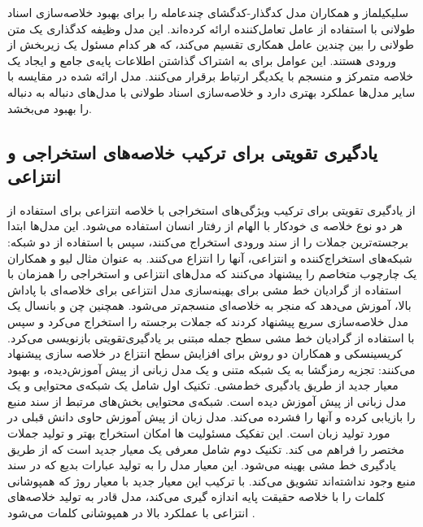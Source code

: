 سلیکیلماز
و همکاران مدل کدگذار-کدگشای چندعامله را برای بهبود خلاصه‌سازی اسناد طولانی با استفاده از عامل تعامل‌کننده
ارائه کرده‌اند. این مدل وظیفه کدگذاری یک متن طولانی را بین چندین عامل همکاری تقسیم می‌کند، که هر کدام مسئول یک زیربخش از ورودی هستند. این عوامل برای به اشتراک گذاشتن اطلاعات پایه‌ی جامع و ایجاد یک خلاصه متمرکز و منسجم با یکدیگر ارتباط برقرار می‌کنند. مدل ارائه شده در مقایسه با سایر مدل‌ها عملکرد بهتری دارد و خلاصه‌سازی اسناد طولانی با مدل‌های دنباله به دنباله را بهبود می‌بخشد.
\subsection{یادگیری تقویتی برای ترکیب خلاصه‌های استخراجی و انتزاعی} 
از یادگیری تقویتی برای ترکیب ویژگی‌های استخراجی با خلاصه انتزاعی برای استفاده از هر دو نوع خلاصه ی خودکار با الهام از رفتار انسان استفاده می‌شود. این مدل‌ها ابتدا برجسته‌ترین جملات را از سند ورودی استخراج می‌کنند، سپس با استفاده از دو شبکه: شبکه‌های استخراج‌کننده و انتزاعی، آنها را انتزاع می‌کنند. به عنوان مثال لیو
و همکاران یک چارچوب متخاصم را پیشنهاد می‌کنند که مدل‌های انتزاعی و استخراجی را همزمان با استفاده از گرادیان خط ‌مشی برای بهینه‌سازی مدل انتزاعی برای خلاصه‌ای با پاداش بالا، آموزش می‌دهد که منجر به خلاصه‌ای منسجم‌تر می‌شود\cite{liu2018generative}.
همچنین چن و بانسال
یک مدل خلاصه‌سازی سریع پیشنهاد کردند که جملات برجسته را استخراج می‌کرد و سپس با استفاده از گرادیان خط مشی سطح جمله مبتنی بر یادگیری‌تقویتی بازنویسی می‌کرد\cite{chen2018fast}.
کریسینسکی 
و همکاران دو روش برای افزایش سطح انتزاع در خلاصه سازی پیشنهاد می‌کنند: تجزیه رمزگشا به یک شبکه متنی و یک مدل زبانی از پیش آموزش‌دیده، و بهبود معیار جدید از طریق یادگیری خط‌مشی.
تکنیک اول شامل یک شبکه‌ی محتوایی
و یک مدل زبانی از پیش آموزش دیده است. شبکه‌ی محتوایی بخش‌های مرتبط از سند منبع را بازیابی کرده و آنها را فشرده می‌کند. مدل زبان از پیش آموزش حاوی دانش قبلی در مورد تولید زبان است. این تفکیک مسئولیت ها امکان استخراج بهتر و تولید جملات مختصر را فراهم می کند.
تکنیک دوم شامل معرفی یک معیار جدید است که از طریق یادگیری خط مشی بهینه می‌شود. این معیار مدل را به تولید عبارات بدیع که در سند منبع وجود نداشته‌اند تشویق می‌کند. با ترکیب این معیار جدید با معیار روژ که همپوشانی کلمات را با خلاصه حقیقت پایه اندازه گیری می‌کند، مدل قادر به تولید خلاصه‌های انتزاعی با عملکرد بالا در همپوشانی کلمات می‌شود \cite{kryscinski-etal-2018-improving}.

